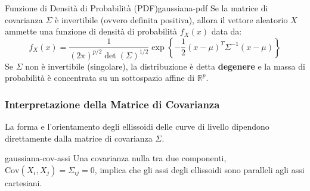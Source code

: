 \begin{proposizione}{Funzione di Densità di Probabilità (PDF)}{gaussiana-pdf}
Se la matrice di covarianza $\Sigma$ è invertibile (ovvero definita positiva),
allora il vettore aleatorio $X$ ammette una funzione di densità di probabilità
$f_X(x)$ data da:
$$
f_X(x) = \frac{1}{(2\pi)^{p/2} \det(\Sigma)^{1/2}}
\exp\left\{-\frac{1}{2}(x-\mu)^T \Sigma^{-1} (x-\mu)\right\}
$$
Se $\Sigma$ non è invertibile (singolare), la distribuzione è detta
\textbf{degenere} e la massa di probabilità è concentrata su un sottospazio
affine di $\mathbb{R}^p$.
\end{proposizione}

\subsubsection*{Interpretazione della Matrice di Covarianza}

La forma e l'orientamento degli ellissoidi delle curve di livello dipendono
direttamente dalla matrice di covarianza $\Sigma$.

\begin{nota}{}{gaussiana-cov-assi}
Una covarianza nulla tra due componenti, $\text{Cov}(X_i, X_j) = \Sigma_{ij} =
0$, implica che gli assi degli ellissoidi sono paralleli agli assi cartesiani.
\end{nota}

